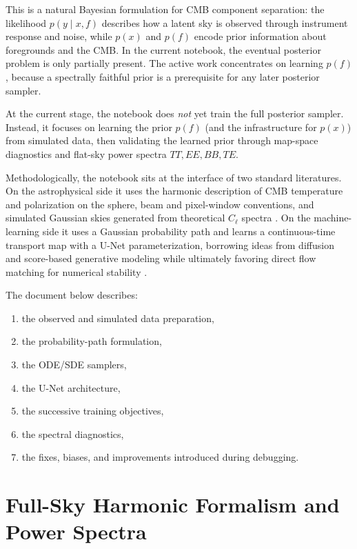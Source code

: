 \documentclass[11pt]{article}
\begin{document}
This is a natural Bayesian formulation for CMB component separation: the likelihood \(p(y\mid x,f)\) describes how a latent sky is observed through instrument response and noise, while \(p(x)\) and \(p(f)\) encode prior information about foregrounds and the CMB. In the current notebook, the eventual posterior problem is only partially present. The active work concentrates on learning \(p(f)\), because a spectrally faithful prior is a prerequisite for any later posterior sampler.

At the current stage, the notebook does \emph{not} yet train the full posterior sampler. Instead, it focuses on learning the prior \(p(f)\) (and the infrastructure for \(p(x)\)) from simulated data, then validating the learned prior through map-space diagnostics and flat-sky power spectra \(TT,EE,BB,TE\).

Methodologically, the notebook sits at the interface of two standard literatures. On the astrophysical side it uses the harmonic description of CMB temperature and polarization on the sphere, beam and pixel-window conventions, and simulated Gaussian skies generated from theoretical \(C_\ell\) spectra \cite{zaldarriaga1997,kamionkowski1997,gorski2005,lewis2000camb}. On the machine-learning side it uses a Gaussian probability path and learns a continuous-time transport map with a U-Net parameterization, borrowing ideas from diffusion and score-based generative modeling while ultimately favoring direct flow matching for numerical stability \cite{ho2020ddpm,song2021sde,lipman2023flowmatching}.

The document below describes:
\begin{enumerate}[leftmargin=1.5em]
  \item the observed and simulated data preparation,
  \item the probability-path formulation,
  \item the ODE/SDE samplers,
  \item the U-Net architecture,
  \item the successive training objectives,
  \item the spectral diagnostics,
  \item the fixes, biases, and improvements introduced during debugging.
\end{enumerate}

\section{Full-Sky Harmonic Formalism and Power Spectra}
\end{document}
